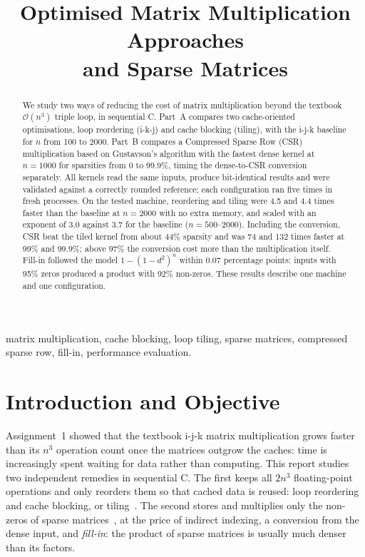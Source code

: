 \documentclass[conference,a4paper]{IEEEtran}
\title{Optimised Matrix Multiplication Approaches\\and Sparse Matrices}
\author{\IEEEauthorblockN{{Javier Ruano Hernández}}
\IEEEauthorblockA{Big Data -- Assignment 2\\
Universidad de Las Palmas de Gran Canaria (ULPGC)\\
Code and data: \url{https://github.com/javierruanohdez/big-data-assignments/tree/main/assignment_2}}}
\newcommand{\bigO}[1]{\mathcal{O}\!\left(#1\right)}
\begin{document}
\maketitle

\begin{abstract}
We study two ways of reducing the cost of matrix multiplication beyond the
textbook $\bigO{n^3}$ triple loop, in sequential C. Part~A compares two
cache-oriented optimisations, loop reordering (i-k-j) and cache blocking
(tiling), with the i-j-k baseline for $n$ from 100 to 2000. Part~B compares a
Compressed Sparse Row (CSR) multiplication based on Gustavson's algorithm with
the fastest dense kernel at $n = 1000$ for sparsities from 0 to 99.9\%, timing
the dense-to-CSR conversion separately. All kernels read the same inputs,
produce bit-identical results and were validated against a correctly rounded
reference; each configuration ran five times in fresh processes. On the tested
machine, reordering and tiling were 4.5 and 4.4 times faster than the baseline
at $n = 2000$ with no extra memory, and scaled with an exponent of 3.0 against
3.7 for the baseline ($n = 500$--2000). Including the conversion, CSR beat the
tiled kernel from about 44\% sparsity and was 74 and 132 times faster at 99\%
and 99.9\%; above 97\% the conversion cost more than the multiplication itself.
Fill-in followed the model $1-(1-d^2)^n$ within 0.07 percentage points: inputs
with 95\% zeros produced a product with 92\% non-zeros. These results describe
one machine and one configuration.
\end{abstract}

\begin{IEEEkeywords}
matrix multiplication, cache blocking, loop tiling, sparse matrices,
compressed sparse row, fill-in, performance evaluation.
\end{IEEEkeywords}

\section{Introduction and Objective}
\label{sec:intro}

Assignment~1 showed that the textbook i-j-k matrix multiplication grows faster
than its $n^3$ operation count once the matrices outgrow the caches: time is
increasingly spent waiting for data rather than computing. This report studies
two independent remedies in sequential C. The first keeps all $2n^3$
floating-point operations and only reorders them so that cached data is reused:
loop reordering and cache blocking, or tiling~\cite{lam1991,wolf1991}. The
second stores and multiplies only the non-zeros of sparse
matrices~\cite{gustavson1978}, at the price of indirect indexing, a conversion
from the dense input, and \emph{fill-in}: the product of sparse matrices is
usually much denser than its factors.
\end{document}
